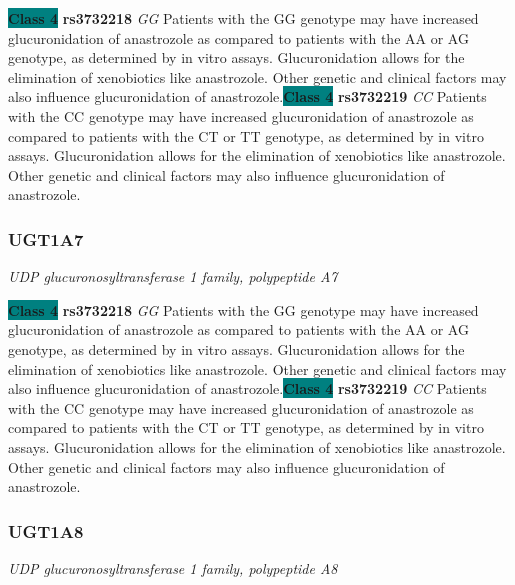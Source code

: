 \documentclass{report}
\begin{document}
\textbf{\colorbox{teal} {Class 4}} \textbf{ rs3732218 } \textit{ GG }
Patients with the GG genotype may have increased glucuronidation of anastrozole as compared to patients with the AA or AG genotype, as determined by in vitro assays. Glucuronidation allows for the elimination of xenobiotics like anastrozole. Other genetic and clinical factors may also influence glucuronidation of anastrozole.\newline\textbf{\colorbox{teal} {Class 4}} \textbf{ rs3732219 } \textit{ CC }
Patients with the CC genotype may have increased glucuronidation of anastrozole as compared to patients with the CT or TT genotype, as determined by in vitro assays. Glucuronidation allows for the elimination of xenobiotics like anastrozole. Other genetic and clinical factors may also influence glucuronidation of anastrozole. \newline\subsubsection{ UGT1A7 }
\textit{ UDP glucuronosyltransferase 1 family, polypeptide A7 }

\textbf{\colorbox{teal} {Class 4}} \textbf{ rs3732218 } \textit{ GG }
Patients with the GG genotype may have increased glucuronidation of anastrozole as compared to patients with the AA or AG genotype, as determined by in vitro assays. Glucuronidation allows for the elimination of xenobiotics like anastrozole. Other genetic and clinical factors may also influence glucuronidation of anastrozole.\newline\textbf{\colorbox{teal} {Class 4}} \textbf{ rs3732219 } \textit{ CC }
Patients with the CC genotype may have increased glucuronidation of anastrozole as compared to patients with the CT or TT genotype, as determined by in vitro assays. Glucuronidation allows for the elimination of xenobiotics like anastrozole. Other genetic and clinical factors may also influence glucuronidation of anastrozole. \newline\subsubsection{ UGT1A8 }
\textit{ UDP glucuronosyltransferase 1 family, polypeptide A8 }
\end{document}
